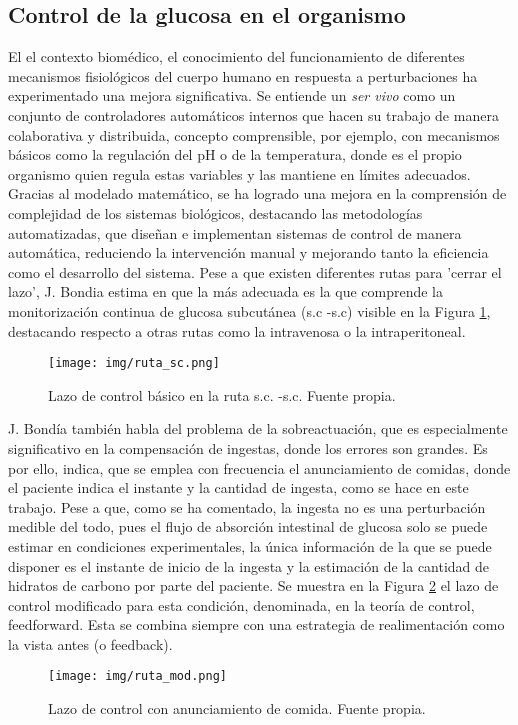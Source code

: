 \subsection{Control de la glucosa en el organismo}

El el contexto biomédico, el conocimiento del funcionamiento de diferentes mecanismos fisiológicos del cuerpo humano en respuesta a perturbaciones ha experimentado una mejora significativa. Se entiende un \textit{ser vivo} como un conjunto de controladores automáticos internos que hacen su trabajo de manera colaborativa y distribuida, concepto comprensible, por ejemplo, con mecanismos básicos como la regulación del pH o de la temperatura, donde es el propio organismo quien regula estas variables y las mantiene en límites adecuados. Gracias al modelado matemático, se ha logrado una mejora en la comprensión de complejidad de los sistemas biológicos, destacando las metodologías automatizadas, que diseñan e implementan sistemas de control de manera automática, reduciendo la intervención manual y mejorando tanto la eficiencia como el desarrollo del sistema. Pese a que existen diferentes rutas para 'cerrar el lazo', J. Bondia estima en \cite{bondia2010pancreas} que la más adecuada es la que comprende la monitorización continua de glucosa subcutánea (s.c -s.c) visible en la Figura \ref{fig:ruta_sc}, destacando respecto a otras rutas como la intravenosa o la intraperitoneal.
\clearpage
\begin{figure}[htbp]
    \centering
    \texttt{[image: img/ruta\_sc.png]}
    \caption{Lazo de control básico en la ruta s.c. -s.c. Fuente propia.}
    \label{fig:ruta_sc}
\end{figure}

J. Bondía también habla del problema de la sobreactuación, que es especialmente significativo en la compensación de ingestas, donde los errores son grandes. Es por ello, indica, que se emplea con frecuencia el anunciamiento de comidas, donde el paciente indica el instante y la cantidad de ingesta, como se hace en este trabajo. Pese a que, como se ha comentado, la ingesta no es una perturbación medible del todo, pues el flujo de absorción intestinal de glucosa solo se puede estimar en condiciones experimentales, la única información de la que se puede disponer es el instante de inicio de la ingesta y la estimación de la cantidad de hidratos de carbono por parte del paciente. Se muestra en la Figura \ref{fig:ruta_mod} el lazo de control modificado para esta condición, denominada, en la teoría de control, feedforward. Esta se combina siempre con una estrategia de realimentación como la vista antes (o feedback).
\clearpage
\begin{figure}[htbp]
    \centering
    \texttt{[image: img/ruta\_mod.png]}
    \caption{Lazo de control con anunciamiento de comida. Fuente propia.}
    \label{fig:ruta_mod}
\end{figure}


